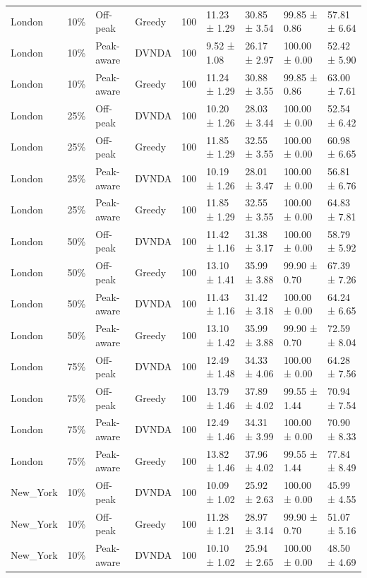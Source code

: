 \begin{tabular}{lllllllll}
London & 10\% & Off-peak & Greedy & 100 & 11.23 ± 1.29 & 30.85 ± 3.54 & 99.85 ± 0.86 & 57.81 ± 6.64 \\
London & 10\% & Peak-aware & DVNDA & 100 & 9.52 ± 1.08 & 26.17 ± 2.97 & 100.00 ± 0.00 & 52.42 ± 5.90 \\
London & 10\% & Peak-aware & Greedy & 100 & 11.24 ± 1.29 & 30.88 ± 3.55 & 99.85 ± 0.86 & 63.00 ± 7.61 \\
London & 25\% & Off-peak & DVNDA & 100 & 10.20 ± 1.26 & 28.03 ± 3.44 & 100.00 ± 0.00 & 52.54 ± 6.42 \\
London & 25\% & Off-peak & Greedy & 100 & 11.85 ± 1.29 & 32.55 ± 3.55 & 100.00 ± 0.00 & 60.98 ± 6.65 \\
London & 25\% & Peak-aware & DVNDA & 100 & 10.19 ± 1.26 & 28.01 ± 3.47 & 100.00 ± 0.00 & 56.81 ± 6.76 \\
London & 25\% & Peak-aware & Greedy & 100 & 11.85 ± 1.29 & 32.55 ± 3.55 & 100.00 ± 0.00 & 64.83 ± 7.81 \\
London & 50\% & Off-peak & DVNDA & 100 & 11.42 ± 1.16 & 31.38 ± 3.17 & 100.00 ± 0.00 & 58.79 ± 5.92 \\
London & 50\% & Off-peak & Greedy & 100 & 13.10 ± 1.41 & 35.99 ± 3.88 & 99.90 ± 0.70 & 67.39 ± 7.26 \\
London & 50\% & Peak-aware & DVNDA & 100 & 11.43 ± 1.16 & 31.42 ± 3.18 & 100.00 ± 0.00 & 64.24 ± 6.65 \\
London & 50\% & Peak-aware & Greedy & 100 & 13.10 ± 1.42 & 35.99 ± 3.88 & 99.90 ± 0.70 & 72.59 ± 8.04 \\
London & 75\% & Off-peak & DVNDA & 100 & 12.49 ± 1.48 & 34.33 ± 4.06 & 100.00 ± 0.00 & 64.28 ± 7.56 \\
London & 75\% & Off-peak & Greedy & 100 & 13.79 ± 1.46 & 37.89 ± 4.02 & 99.55 ± 1.44 & 70.94 ± 7.54 \\
London & 75\% & Peak-aware & DVNDA & 100 & 12.49 ± 1.46 & 34.31 ± 3.99 & 100.00 ± 0.00 & 70.90 ± 8.33 \\
London & 75\% & Peak-aware & Greedy & 100 & 13.82 ± 1.46 & 37.96 ± 4.02 & 99.55 ± 1.44 & 77.84 ± 8.49 \\
New\_York & 10\% & Off-peak & DVNDA & 100 & 10.09 ± 1.02 & 25.92 ± 2.63 & 100.00 ± 0.00 & 45.99 ± 4.55 \\
New\_York & 10\% & Off-peak & Greedy & 100 & 11.28 ± 1.21 & 28.97 ± 3.14 & 99.90 ± 0.70 & 51.07 ± 5.16 \\
New\_York & 10\% & Peak-aware & DVNDA & 100 & 10.10 ± 1.02 & 25.94 ± 2.65 & 100.00 ± 0.00 & 48.50 ± 4.69 \\

\end{tabular}

